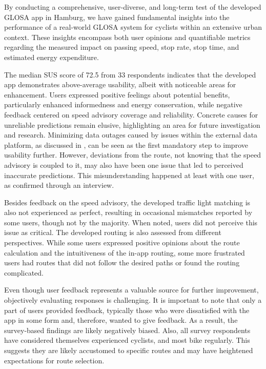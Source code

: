 \begin{Summary}
By conducting a comprehensive, user-diverse, and long-term test of the developed GLOSA app in Hamburg, we have gained fundamental insights into the performance of a real-world GLOSA system for cyclists within an extensive urban context. These insights encompass both user opinions and quantifiable metrics regarding the measured impact on passing speed, stop rate, stop time, and estimated energy expenditure.

The median SUS score of 72.5 from 33 respondents indicates that the developed app demonstrates above-average usability, albeit with noticeable areas for enhancement. Users expressed positive feelings about potential benefits, particularly enhanced informedness and energy conservation, while negative feedback centered on speed advisory coverage and reliability. Concrete causes for unreliable predictions remain elusive, highlighting an area for future investigation and research. Minimizing data outages caused by issues within the external data platform, as discussed in , can be seen as the first mandatory step to improve usability further. However, deviations from the route, not knowing that the speed advisory is coupled to it, may also have been one issue that led to perceived inaccurate predictions. This misunderstanding happened at least with one user, as confirmed through an interview.

Besides feedback on the speed advisory, the developed traffic light matching is also not experienced as perfect, resulting in occasional mismatches reported by some users, though not by the majority. When noted, users did not perceive this issue as critical. The developed routing is also assessed from different perspectives. While some users expressed positive opinions about the route calculation and the intuitiveness of the in-app routing, some more frustrated users had routes that did not follow the desired paths or found the routing complicated. 

Even though user feedback represents a valuable source for further improvement, objectively evaluating responses is challenging. It is important to note that only a part of users provided feedback, typically those who were dissatisfied with the app in some form and, therefore, wanted to give feedback. As a result, the survey-based findings are likely negatively biased. Also, all survey respondents have considered themselves experienced cyclists, and most bike regularly. This suggests they are likely accustomed to specific routes and may have heightened expectations for route selection.


\end{Summary}
